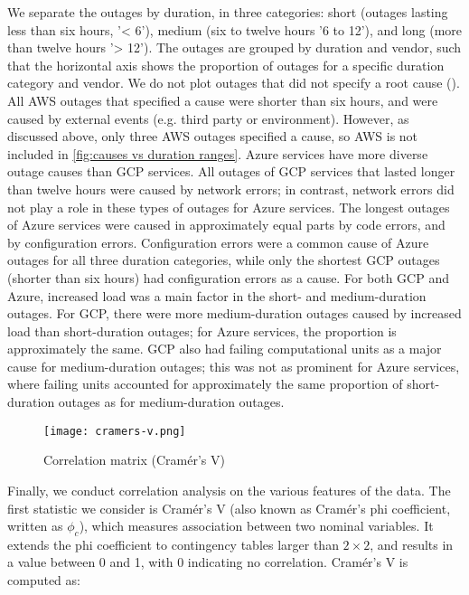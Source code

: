 We separate the outages by duration, in three categories: short (outages lasting less than six hours, '< 6'), medium (six to twelve hours '6 to 12'), and long (more than twelve hours '> 12').
The outages are grouped by duration and vendor, such that the horizontal axis shows the proportion of outages for a specific duration category and vendor.
We do not plot outages that did not specify a root cause ().
All AWS outages that specified a cause were shorter than six hours, and were caused by external events (e.g. third party or environment).
However, as discussed above, only three AWS outages specified a cause, so AWS is not included in \autoref{fig:causes vs duration ranges}.
Azure services have more diverse outage causes than GCP services.
All outages of GCP services that lasted longer than twelve hours were caused by network errors; in contrast, network errors did not play a role in these types of outages for Azure services.
The longest outages of Azure services were caused in approximately equal parts by code errors, and by configuration errors.
Configuration errors were a common cause of Azure outages for all three duration categories, while only the shortest GCP outages (shorter than six hours) had configuration errors as a cause.
For both GCP and Azure, increased load was a main factor in the short- and medium-duration outages.
For GCP, there were more medium-duration outages caused by increased load than short-duration outages; for Azure services, the proportion is approximately the same.
GCP also had failing computational units as a major cause for medium-duration outages; this was not as prominent for Azure services, where failing units accounted for approximately the same proportion of short-duration outages as for medium-duration outages.

\begin{figure}[h]
  \centering
  \texttt{[image: cramers-v.png]}
  \caption{Correlation matrix (Cram\'{e}r's V)}
  \label{fig:cramers v}
\end{figure}

Finally, we conduct correlation analysis on the various features of the data.
The first statistic we consider is Cram\'{e}r's V (also known as Cram\'{e}r's phi coefficient, written as $\phi_c$), which measures association between two nominal variables.
It extends the phi coefficient to contingency tables larger than $2 \times 2$, and results in a value between 0 and 1, with 0 indicating no correlation.
Cram\'{e}r's V is computed as:

